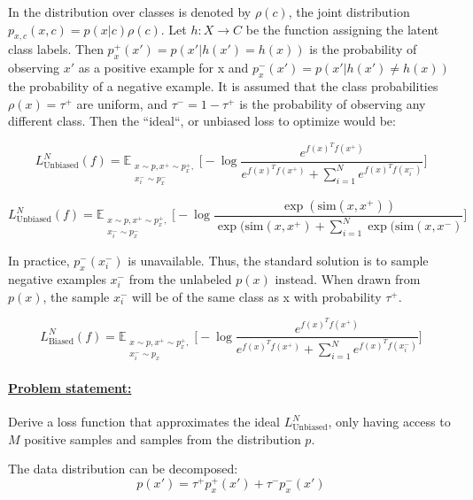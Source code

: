 \documentclass{article}
\begin{document}
In \citep{chuang2021debiased} the distribution over classes is denoted by $\rho(c)$, the joint distribution $p_{x,c}(x, c) = p(x|c)\rho(c)$. Let $h : X \rightarrow C$ be the function assigning the latent class labels. Then $p^+_x(x') = p(x'|h(x') = h(x))$ is the probability of observing $x'$ as a positive example for x and $p^-_x(x') = p(x'|h(x') \neq h(x))$ the probability of a negative example. It is assumed that the class probabilities $\rho(x) = \tau^+$ are uniform, and $\tau^- = 1 - \tau^+$ is the probability of observing any different class. Then the  ``ideal``, or unbiased loss to optimize would be:

\begin{equation}
L_{\text{Unbiased}}^N(f) = \mathbb{E}_{\substack{x \sim p, x^+ \sim p^+_x,\\ x_i^- \sim p_x^-}} \bigg[-\log \frac{e^{f(x)^T f(x^+)}}{e^{f(x)^T f(x^+)} + \sum _{i=1}^N e^{f(x)^T f(x_i^-)}}\bigg]
\end{equation}

\begin{equation}
L_{\text{Unbiased}}^N(f) = \mathbb{E}_{\substack{x \sim p, x^+ \sim p^+_x,\\ x_i^- \sim p_x^-}} \bigg[-\log \frac{\exp (\text{sim}(x, x^+))}{\exp (\text{sim}(x, x^+) + \sum _{i=1}^N \exp (\text{sim}(x, x^-)}\bigg]
\end{equation}

In practice, $p_x^-(x_i^-)$ is unavailable.
Thus, the standard solution is to sample negative examples $x_i^-$ from the unlabeled $p(x)$ instead. When drawn from $p(x)$, the sample $x_i^-$ will be of the same class as x with probability $\tau^+$.

\begin{equation}
L_{\text{Biased}}^N(f) = \mathbb{E}_{\substack{x \sim p, x^+ \sim p^+_x,\\ x_i^- \sim p_x}} \bigg[-\log \frac{e^{f(x)^T f(x^+)}}{e^{f(x)^T f(x^+)} + \sum _{i=1}^N e^{f(x)^T f(x_i^-)}}\bigg]
\end{equation}

\paragraph{\underline{Problem statement:}} Derive a loss function that approximates the ideal $L_{\text{Unbiased}}^N$, only having access to $M$ positive samples and samples from the distribution $p$.



The data distribution can be decomposed:
\begin{equation}
p(x') = \tau^+ p^+_x(x') + \tau^-p_x^-(x')
\end{equation}
\end{document}
